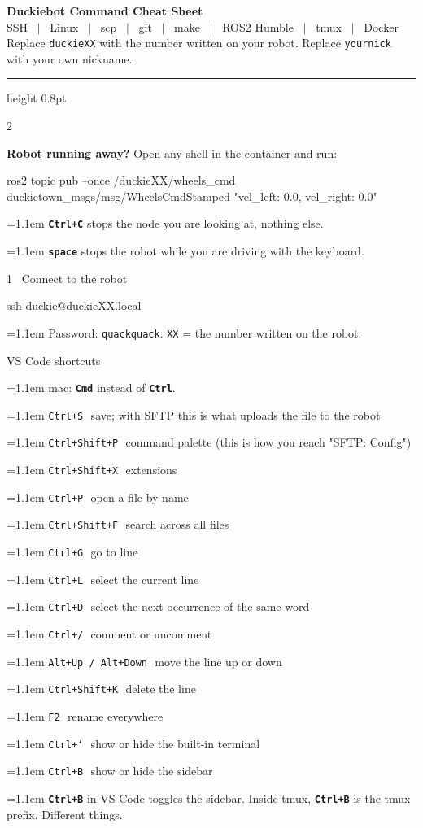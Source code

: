 \documentclass[10pt,a4paper]{extarticle}
\newcommand{\code}[1]{\textcolor{accentd}{\texttt{#1}}}
\newcommand{\key}[1]{\textcolor{robotc}{\texttt{\textbf{#1}}}}
\newcommand{\ce}[2]{\par\hangindent=1.1em\hangafter=1
  \code{#1}\,\textcolor{dim}{\small\textemdash\ #2}\par\vspace{0.5pt}}
\newcommand{\nt}[1]{\par\hangindent=1.1em\hangafter=1
  \textcolor{dim}{\small #1}\par\vspace{0.5pt}}
\begin{document}
\begin{center}
{\sffamily\bfseries\Large\color{accent} Duckiebot Command Cheat Sheet}\\[2pt]
{\sffamily\footnotesize\color{dim} SSH \ $|$ \ Linux \ $|$ \ scp \ $|$ \ git \ $|$ \ make \ $|$ \ ROS2 Humble \ $|$ \ tmux \ $|$ \ Docker}\\[3pt]
{\footnotesize Replace \code{duckieXX} with the number written on your robot. Replace \code{yournick} with your own nickname.}
\end{center}
\vspace{2pt}
{\color{accent!55}\hrule height 0.8pt}
\vspace{4pt}

\begin{multicols}{2}
\raggedcolumns

\begin{stopbox}
{\bfseries Robot running away?} Open any shell in the container and run:
\begin{cmdred}
ros2 topic pub --once /duckieXX/wheels_cmd duckietown_msgs/msg/WheelsCmdStamped "{vel_left: 0.0, vel_right: 0.0}"
\end{cmdred}
\vspace{2pt}
\nt{\key{Ctrl+C} stops the node you are looking at, nothing else.}
\nt{\key{space} stops the robot while you are driving with the keyboard.}
\end{stopbox}

\begin{sect}{1 \ Connect to the robot}
\begin{cmd}
ssh duckie@duckieXX.local
\end{cmd}
\nt{Password: \code{quackquack}. \code{XX} = the number written on the robot.}
\end{sect}

\begin{sect}{VS Code shortcuts}
\nt{mac: \key{Cmd} instead of \key{Ctrl}.}
\ce{Ctrl+S}{save; with SFTP this is what uploads the file to the robot}
\ce{Ctrl+Shift+P}{command palette (this is how you reach "SFTP: Config")}
\ce{Ctrl+Shift+X}{extensions}
\ce{Ctrl+P}{open a file by name}
\ce{Ctrl+Shift+F}{search across all files}
\ce{Ctrl+G}{go to line}
\ce{Ctrl+L}{select the current line}
\ce{Ctrl+D}{select the next occurrence of the same word}
\ce{Ctrl+/}{comment or uncomment}
\ce{Alt+Up / Alt+Down}{move the line up or down}
\ce{Ctrl+Shift+K}{delete the line}
\ce{F2}{rename everywhere}
\ce{Ctrl+`}{show or hide the built-in terminal}
\ce{Ctrl+B}{show or hide the sidebar}
\nt{\key{Ctrl+B} in VS Code toggles the sidebar. Inside tmux, \key{Ctrl+B} is the tmux prefix. Different things.}
\end{sect}


\end{multicols}
\end{document}
